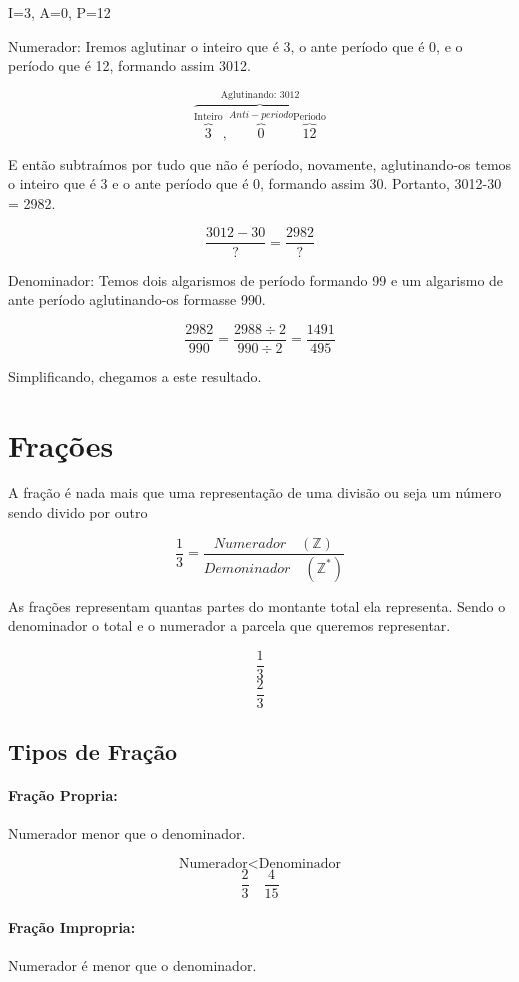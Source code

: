 \documentclass[letterpaper]{book}
\begin{document}
I=3, A=0, P=12

Numerador: Iremos aglutinar o inteiro que é 3, o ante período que é 0, e o período que é 12, formando assim 3012.

\[\overbrace{\overbrace{3}^{\text{Inteiro}},\overbrace{0}^{Anti-periodo}\overbrace{12}^{\text{Periodo}}}^{\text{Aglutinando: }3012}\]

E então subtraímos por tudo que não é período, novamente, aglutinando-os temos o inteiro que é 3 e o ante período que é 0, formando assim 30. Portanto, 3012-30 = 2982.

\[\dfrac{3012-30}{?} = \dfrac{2982}{?}\]

Denominador: Temos dois algarismos de período formando 99 e um algarismo de ante período aglutinando-os formasse 990.

\[\dfrac{2982}{990} = \dfrac{2988 \div 2}{990 \div 2} = \dfrac{1491}{495}\]

Simplificando, chegamos a este resultado.

\section{Frações}

A fração é nada mais que uma representação de uma divisão ou seja um número sendo divido por outro

\[\dfrac{1}{3} = \dfrac{Numerador \quad (\mathbb{Z})}{Demoninador \quad (\mathbb{Z^{*}})}\]



As frações representam quantas partes do montante total ela representa. Sendo o denominador o total e o numerador a parcela que queremos representar.

\[\dfrac{1}{3}\]
\[\dfrac{2}{3}\]

\subsection{Tipos de Fração}

\paragraph{Fração Propria:} Numerador menor que o denominador. 

\[\text{Numerador} < \text{Denominador}\]
\[\dfrac{2}{3} \quad \dfrac{4}{15}\]

\paragraph{Fração Impropria:} Numerador é menor que o denominador.
\end{document}
